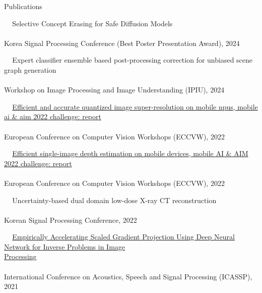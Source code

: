 \documentclass{resume} %
\newcommand{\mycolor}[1]{\textcolor{myurlcolor}{#1}}
\begin{document}
\begin{rSection}{Publications {}}

\textbullet~\,\, {\mycolor{Selective Concept Erasing for Safe Diffusion Models}}
\\ 
\\ \hspace*{1.5em}Korea Signal Processing Conference (Best Poster Presentation Award), 2024

\textbullet~\,\, {\mycolor{Expert classifier ensemble based post-processing correction for unbiased scene graph generation}}
\\ 
\\ \hspace*{1.5em}Workshop on Image Processing and Image Understanding (IPIU), 2024


\textbullet~\,\, \href{https://link.springer.com/chapter/10.1007/978-3-031-25066-8_4}{Efficient and accurate quantized image super-resolution on mobile npus, mobile ai \& aim 2022 challenge: report
}
\\ 
\\ \hspace*{1.5em}European Conference on Computer Vision Workshops (ECCVW), 2022


\textbullet~\,\, \href{https://link.springer.com/chapter/10.1007/978-3-031-25066-8_4}{Efficient single-image depth estimation on mobile devices, mobile AI \& AIM 2022 challenge: report}
\\ 
\\ \hspace*{1.5em}European Conference on Computer Vision Workshops (ECCVW), 2022

\textbullet~\,\, {\mycolor{Uncertainty-based dual domain low-dose X-ray CT reconstruction}}
\\ 
\\ \hspace*{1.5em}Korean Signal Processing Conference, 2022

\textbullet~\,\, \href{https://ieeexplore.ieee.org/document/9415023}{Empirically Accelerating Scaled Gradient Projection Using Deep Neural Network for Inverse Problems in Image \\ \hspace*{1.5em}Processing}
\\ 
\\ \hspace*{1.5em}International Conference on Acoustics, Speech and Signal Processing (ICASSP), 2021 
\end{rSection} 
\end{document}
